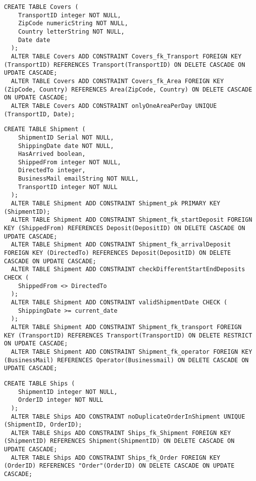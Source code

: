 \begin{lstlisting}[caption={Creazione della tabella \textbf{Covers}}]
  CREATE TABLE Covers (
    TransportID integer NOT NULL,
    ZipCode numericString NOT NULL,
    Country letterString NOT NULL,
    Date date
  );
  ALTER TABLE Covers ADD CONSTRAINT Covers_fk_Transport FOREIGN KEY (TransportID) REFERENCES Transport(TransportID) ON DELETE CASCADE ON UPDATE CASCADE;
  ALTER TABLE Covers ADD CONSTRAINT Covers_fk_Area FOREIGN KEY (ZipCode, Country) REFERENCES Area(ZipCode, Country) ON DELETE CASCADE ON UPDATE CASCADE;
  ALTER TABLE Covers ADD CONSTRAINT onlyOneAreaPerDay UNIQUE (TransportID, Date);
\end{lstlisting}

\newpage
\begin{lstlisting}[caption={Creazione della tabella \textbf{Shipment}}]
  CREATE TABLE Shipment (
    ShipmentID Serial NOT NULL,
    ShippingDate date NOT NULL,
    HasArrived boolean,
    ShippedFrom integer NOT NULL,
    DirectedTo integer,
    BusinessMail emailString NOT NULL,
    TransportID integer NOT NULL
  );
  ALTER TABLE Shipment ADD CONSTRAINT Shipment_pk PRIMARY KEY (ShipmentID);
  ALTER TABLE Shipment ADD CONSTRAINT Shipment_fk_startDeposit FOREIGN KEY (ShippedFrom) REFERENCES Deposit(DepositID) ON DELETE CASCADE ON UPDATE CASCADE;
  ALTER TABLE Shipment ADD CONSTRAINT Shipment_fk_arrivalDeposit FOREIGN KEY (DirectedTo) REFERENCES Deposit(DepositID) ON DELETE CASCADE ON UPDATE CASCADE;
  ALTER TABLE Shipment ADD CONSTRAINT checkDifferentStartEndDeposits CHECK (
    ShippedFrom <> DirectedTo
  );
  ALTER TABLE Shipment ADD CONSTRAINT validShipmentDate CHECK (
    ShippingDate >= current_date
  );
  ALTER TABLE Shipment ADD CONSTRAINT Shipment_fk_transport FOREIGN KEY (TransportID) REFERENCES Transport(TransportID) ON DELETE RESTRICT ON UPDATE CASCADE;
  ALTER TABLE Shipment ADD CONSTRAINT Shipment_fk_operator FOREIGN KEY (BusinessMail) REFERENCES Operator(Businessmail) ON DELETE CASCADE ON UPDATE CASCADE;
\end{lstlisting} %

\begin{lstlisting}[caption={Creazione della tabella \textbf{Ships}}]
  CREATE TABLE Ships ( 
    ShipmentID integer NOT NULL,
    OrderID integer NOT NULL
  );
  ALTER TABLE Ships ADD CONSTRAINT noDuplicateOrderInShipment UNIQUE (ShipmentID, OrderID);
  ALTER TABLE Ships ADD CONSTRAINT Ships_fk_Shipment FOREIGN KEY (ShipmentID) REFERENCES Shipment(ShipmentID) ON DELETE CASCADE ON UPDATE CASCADE;
  ALTER TABLE Ships ADD CONSTRAINT Ships_fk_Order FOREIGN KEY (OrderID) REFERENCES "Order"(OrderID) ON DELETE CASCADE ON UPDATE CASCADE;
\end{lstlisting}

